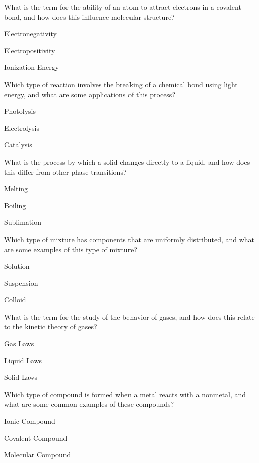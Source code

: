 \begin{enhancedmcq}{What is the term for the ability of an atom to attract electrons in a covalent bond, and how does this influence molecular structure?}
\item Electronegativity
\item Electropositivity
\item Ionization Energy

\end{enhancedmcq}
\begin{enhancedmcq}{Which type of reaction involves the breaking of a chemical bond using light energy, and what are some applications of this process?}
\item Photolysis
\item Electrolysis
\item Catalysis

\end{enhancedmcq}
\begin{enhancedmcq}{What is the process by which a solid changes directly to a liquid, and how does this differ from other phase transitions?}
\item Melting
\item Boiling
\item Sublimation

\end{enhancedmcq}
\begin{enhancedmcq}{Which type of mixture has components that are uniformly distributed, and what are some examples of this type of mixture?}
\item Solution
\item Suspension
\item Colloid

\end{enhancedmcq}
\begin{enhancedmcq}{What is the term for the study of the behavior of gases, and how does this relate to the kinetic theory of gases?}
\item Gas Laws
\item Liquid Laws
\item Solid Laws

\end{enhancedmcq}
\begin{enhancedmcq}{Which type of compound is formed when a metal reacts with a nonmetal, and what are some common examples of these compounds?}
\item Ionic Compound
\item Covalent Compound
\item Molecular Compound

\end{enhancedmcq}
